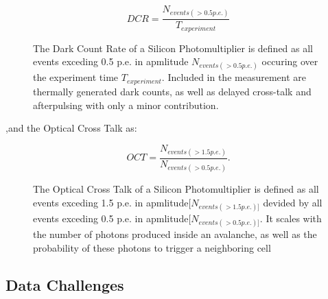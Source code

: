 \documentclass[12pt,article,type=msc,colorback,accentcolor=tud9c]{tudthesis}
\begin{document}
\begin{figure}[h]
\begin{equation}
DCR = \frac{N_{events(>0.5p.e.)}}{T_{experiment}}
\end{equation}
\label{DCR_eq}
\caption{The Dark Count Rate of a Silicon Photomultiplier is defined as all events exceding 0.5 p.e. in apmlitude $N_{events(>0.5p.e.)}$ occuring over the experiment time $T_{experiment}$. Included in the measurement are thermally generated dark counts, as well as delayed cross-talk and afterpulsing with only a minor contribution.}
\end{figure}
,and the Optical Cross Talk as:
\begin{figure}[h]
\begin{equation}
OCT = \frac{N_{events(>1.5p.e.)}}{N_{events(>0.5p.e.)}}.
\end{equation}
\label{OCT_eq}
\caption{The Optical Cross Talk of a Silicon Photomultiplier is defined as all events exceding 1.5 p.e. in apmlitude$[N_{events(>1.5p.e.)]}$ devided by all events exceding 0.5 p.e. in apmlitude$[N_{events(>0.5p.e.)]}$. It scales with the number of photons produced inside an avalanche, as well as the probability of these photons to trigger a neighboring cell}
\end{figure}

\subsection{Data Challenges}
\end{document}

